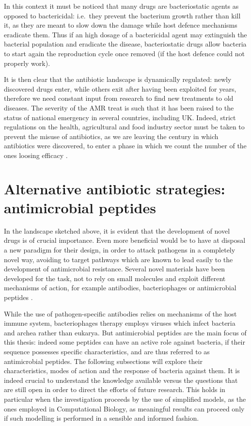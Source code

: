 In this context it must be noticed that many drugs are bacteriostatic agents as opposed to bactericidal: i.e.\ they prevent the bacterium growth rather than kill it, as they are meant to slow down the damage while host defence mechanisms eradicate them.
%
Thus if an high dosage of a bactericidal agent may extinguish the bacterial population and eradicate the disease, bacteriostatic drugs allow bacteria to start again the reproduction cycle once removed (if the host defence could not properly work).

It is then clear that the antibiotic landscape is dynamically regulated: newly discovered drugs enter, while others exit after having been exploited for years, therefore we need constant input from research to find new treatments to old diseases. The severity of the AMR treat is such that it has been raised to the status of national emergency in several countries, including UK. Indeed, strict regulations on the health, agricultural and food industry sector must be taken to prevent the misuse of antibiotics, as we are leaving the century in which antibiotics were discovered, to enter a phase in which we count the number of the ones loosing efficacy \citep{Oneill2016}.


\section{Alternative antibiotic strategies: antimicrobial peptides}
In the landscape sketched above, it is evident that the development of novel drugs is of crucial importance. Even more beneficial would be to have at disposal a new paradigm for their design, in order to attack pathogens in a completely novel way, avoiding to target pathways which are known to lead easily to the development of antimicrobial resistance. Several novel materials have been developed for the task, not to rely on small molecules and exploit different mechanisms of action, for example antibodies, bacteriophages or antimicrobial peptides \citep{Mantravadi2019}.

While the use of pathogen-specific antibodies relies on mechanisms of the host immune system, bacteriophages therapy employs viruses which infect bacteria and archea rather than eukarya.
%
But antimicrobial peptides are the main focus of this thesis: indeed some peptides can have an active role against bacteria, if their sequence possesses specific characteristics, and are thus referred to as antimicrobial peptides. The following subsections will explore their characteristics, modes of action and the response of bacteria against them. It is indeed crucial to understand the knowledge available versus the questions that are still open in order to direct the efforts of future research. This holds in particular when the investigation proceeds by the use of simplified models, as the ones employed in Computational Biology, as meaningful results can proceed only if such modelling is performed in a sensible and informed fashion.

